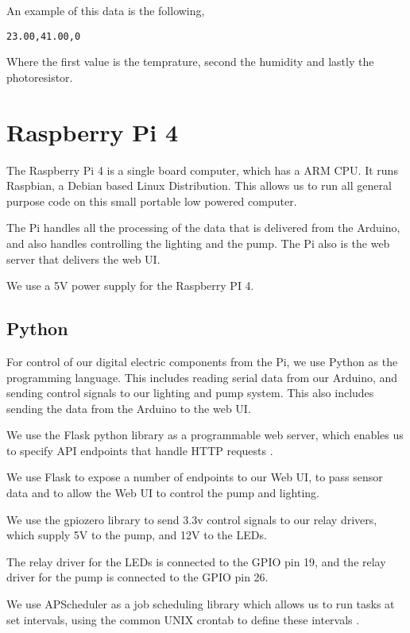 \documentclass[a4paper,12pt,twoside,openright,titlepage]{book}
\begin{document}
An example of this data is the following,
\begin{verbatim}
23.00,41.00,0
\end{verbatim}

Where the first value is the temprature, second the humidity and lastly the photoresistor.

\section{Raspberry Pi 4}
The Raspberry Pi 4 is a single board computer, which has a ARM CPU.
It runs Raspbian, a Debian based Linux Distribution.
This allows us to run all general purpose code on this small portable low powered computer.

The Pi handles all the processing of the data that is delivered from the Arduino, and also handles controlling the lighting and the pump.
The Pi also is the web server that delivers the web UI.

We use a 5V power supply for the Raspberry PI 4.

\subsection{Python}
For control of our digital electric components from the Pi, we use Python as the programming language.
This includes reading serial data from our Arduino, and sending control signals to our lighting and pump system. This also includes sending the data from the Arduino to the web UI.

We use the Flask python library as a programmable web server, which enables us to specify API endpoints that handle HTTP requests \cite{flask}.

We use Flask to expose a number of endpoints to our Web UI, to pass sensor data and to allow the Web UI to control the pump and lighting.

\bigskip

We use the gpiozero library to send 3.3v control signals to our relay drivers, which supply 5V to the pump, and 12V to the LEDs.

The relay driver for the LEDs is connected to the GPIO pin 19, and the relay driver for the pump is connected to the GPIO pin 26.

\bigskip

We use APScheduler as a job scheduling library which allows us to run tasks at set intervals, using the common UNIX crontab to define these intervals \cite{apscheduler}.
\end{document}
